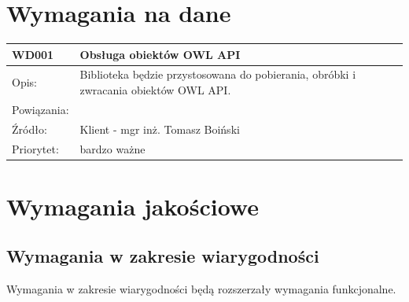\documentclass[a4paper,10pt]{article}
\begin{document}
\section{Wymagania na dane}


\begin{center}
 
\begin{tabular}{|m{3cm}|m{9cm}|} \hline

WD001 & Obsługa obiektów OWL API \\ \hline
Opis: & Biblioteka będzie przystosowana do pobierania, obróbki i zwracania obiektów OWL API. \\ \hline
Powiązania: &  \\ \hline
Źródło: & Klient - mgr inż. Tomasz Boiński  \\ \hline
Priorytet: &  bardzo ważne \\ \hline

\end{tabular}

\end{center}

\section{Wymagania jakościowe}


\subsection{Wymagania w zakresie wiarygodności}

Wymagania w zakresie wiarygodności będą rozszerzały wymagania funkcjonalne. 
\end{document}
